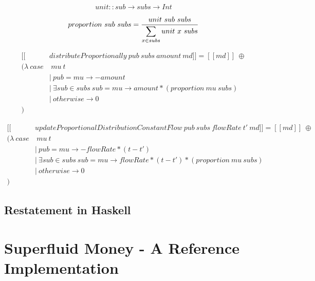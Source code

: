 \documentclass[a4paper,10pt]{report}
\begin{document}
\begin{equation}
    unit :: sub \rightarrow subs \rightarrow Int
\end{equation}

\begin{equation}
    proportion\ sub\ subs = {{ unit\ sub\ subs } \over { \displaystyle \sum_{x \in subs} unit\ x\ subs }}
\end{equation}

\begin{equation}\label{sem_distributeProportionally}
    \begin{split}
        [\![&distributeProportionally\ pub\ subs\ amount\ md]\!] = [\![md]\!]\ \oplus \\
        (\lambda\ case&\ mu\ t \\
        &|\ pub = mu \rightarrow -amount \\
        &|\ \exists sub \in subs\ { sub = mu } \rightarrow amount * (proportion\ mu\ subs) \\
        &|\ otherwise \rightarrow 0 \\
        )
    \end{split}
\end{equation}

\begin{equation}\label{sem_distributeProportionally}
    \begin{split}
        [\![&updateProportionalDistributionConstantFlow\ pub\ subs\ flowRate\ t'\ md]\!] = [\![md]\!]\ \oplus \\
        (\lambda\ case&\ mu\ t \\
        &|\ pub = mu \rightarrow -flowRate * (t - t') \\
        &|\ \exists sub \in subs\ { sub = mu } \rightarrow flowRate * (t - t') * (proportion\ mu\ subs) \\
        &|\ otherwise \rightarrow 0 \\
        )
    \end{split}
\end{equation}

\section{Restatement in Haskell}

\chapter{Superfluid Money - A Reference Implementation}
\end{document}
